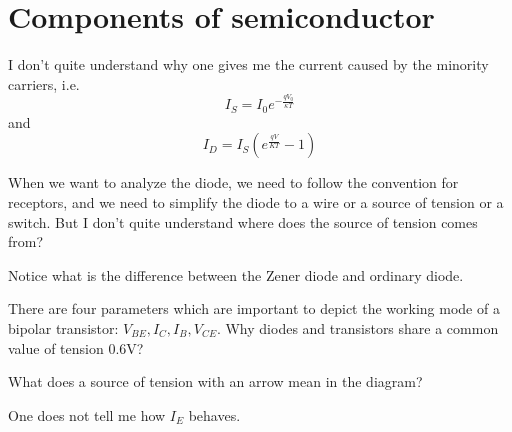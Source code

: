 \section{Components of semiconductor}
I don't quite understand why one gives me the current caused by the minority carriers, i.e.
$$
I_S=I_0e^{-\frac{qV_0}{\kappa T}}
$$
and
$$
I_D=I_S(e^{\frac{qV}{KT}}-1)
$$

When we want to analyze the diode, we need to follow the convention for receptors, and we need to simplify the diode to a wire or a source of tension or a switch. But I don't quite understand where does the source of tension comes from?

Notice what is the difference between the Zener diode and ordinary diode.

There are four parameters which are important to depict the working mode of a bipolar transistor: $V_{BE},I_C,I_B,V_{CE}$. Why diodes and transistors share a common value of tension $0.6\text{V}$?

What does a source of tension with an arrow mean in the diagram?

One does not tell me how $I_{E}$ behaves.